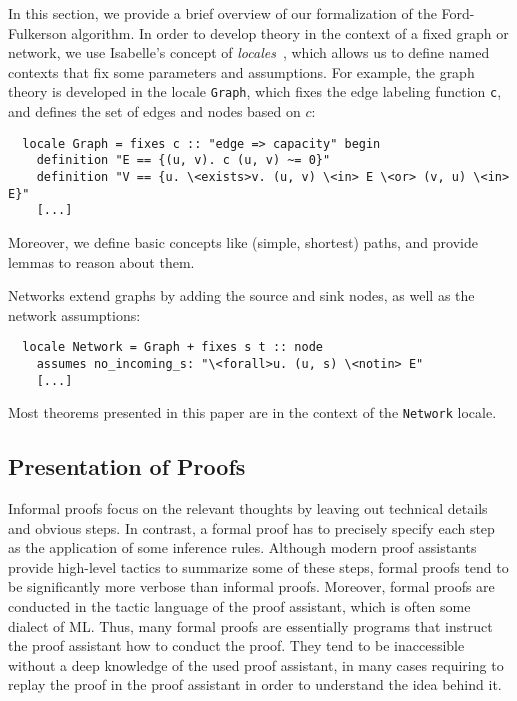 \documentclass[smallcondensed]{svjour3}     %
\newcommand{\isai}{\lstinline[language=isabelle,basicstyle=\normalsize\ttfamily\slshape]}
\begin{document}

In this section, we provide a brief overview of our formalization of the Ford-Fulkerson algorithm. 
In order to develop theory in the context of a fixed graph or network, we use Isabelle's concept of \emph{locales}~\cite{Ballarin:2006:MKM}, which allows
us to define named contexts that fix some parameters and assumptions.
For example, the graph theory is developed in the locale \isai{Graph}, which 
fixes the edge labeling function \isai{c}, and defines the set of edges and nodes based on $c$:
\begin{lstlisting}
  locale Graph = fixes c :: "edge => capacity" begin
    definition "E == {(u, v). c (u, v) ~= 0}"
    definition "V == {u. \<exists>v. (u, v) \<in> E \<or> (v, u) \<in> E}"
    [...]
\end{lstlisting}
Moreover, we define basic concepts like (simple, shortest) paths, and provide lemmas to reason about them.

Networks extend graphs by adding the source and sink nodes, as well as the network assumptions:
\begin{lstlisting}
  locale Network = Graph + fixes s t :: node
    assumes no_incoming_s: "\<forall>u. (u, s) \<notin> E"
    [...]
\end{lstlisting}
Most theorems presented in this paper are in the context of the \isai{Network} locale.

\subsection{Presentation of Proofs}
Informal proofs focus on the relevant thoughts by leaving out technical details and obvious steps. 
In contrast, a formal proof has to precisely specify each step as the application of some inference rules. 
Although modern proof assistants provide high-level tactics to summarize some of these steps, formal proofs tend to be significantly more 
verbose than informal proofs. Moreover, formal proofs are conducted in the tactic language of the proof assistant, which is often some dialect of ML. 
Thus, many formal proofs are essentially programs that instruct the proof assistant how to conduct the proof. They tend to be inaccessible without a deep knowledge of the used proof assistant, in many cases requiring to replay the proof in the proof assistant in order to understand the idea behind it.
\end{document}
